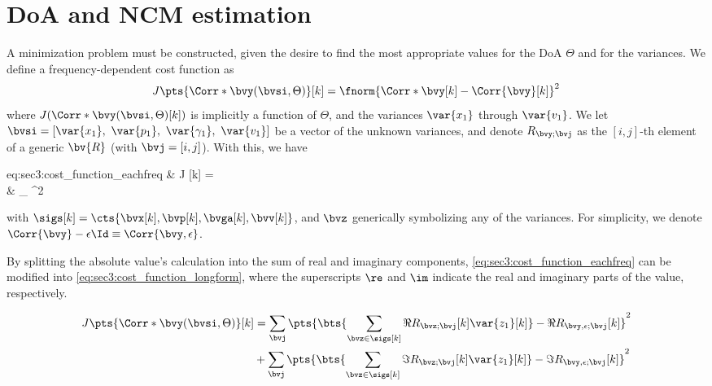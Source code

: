 \section{DoA and NCM estimation}
\label{sec:doa_ncm_estimation}

A minimization problem must be constructed, given the desire to find the most appropriate values for the DoA $\Theta$ and for the variances. We define a frequency-dependent cost function as
\begin{equation}
	\label{eq:sec3:cost_function}
	J\pts{\Corr*{\bvy}(\bvsi,\Theta)}[k] = \fnorm{\Corr*{\bvy}[k] - \Corr{\bvy}[k]}^2
\end{equation}
where $J(\Corr*{\bvy}(\bvsi,\Theta)[k])$ is implicitly a function of $\Theta$, and the variances $\var{x_1}$ through $\var{v_1}$. We let $\bvsi = \left[\var{x_1},~\var{p_1},~\var{\gamma_1},~\var{v_1}\right]$ be a vector of the unknown variances, and denote $R_{\bvy;\bvj}$ as the $[i,j]$-th element of a generic $\bv{R}$ (with $\bvj = [i,j]$). With this, we have
\begin{equations}{eq:sec3:cost_function_eachfreq}
	& J\pts{\Corr*{\bvy}(\bvsi,\Theta)} [k] = \\
	& \sum_{\bvj} ^2
\end{equations}
with $\sigs[k] = \cts{\bvx[k],\bvp[k],\bvga[k],\bvv[k]}$, and $\bvz$ generically symbolizing any of the variances. For simplicity, we denote $ \Corr{\bvy} - \epsilon\Id \equiv \Corr{\bvy,\epsilon}$.

By splitting the absolute value's calculation into the sum of real and imaginary components, \cref{eq:sec3:cost_function_eachfreq} can be modified into \cref{eq:sec3:cost_function_longform}, where the superscripts $\re$ and $\im$ indicate the real and imaginary parts of the value, respectively.

\begin{equation}
	\begin{split}
		J\pts{\Corr*{\bvy}(\bvsi,\Theta)} [k] 
		& = \sum_{\bvj}
		\pts{\bts{\sum_{\bvz\in\sigs[k]} \Re{R_{\bvz;\bvj}}[k] \var{z_1}[k]} - \Re{R_{\bvy,\epsilon;\bvj}}[k]}^2 \\
		& + \sum_{\bvj}
		\pts{\bts{\sum_{\bvz\in\sigs[k]} \Im{R_{\bvz;\bvj}}[k] \var{z_1}[k]} - \Im{R_{\bvy,\epsilon;\bvj}}[k]}^2
	\end{split}
	\label{eq:sec3:cost_function_longform}
\end{equation}

